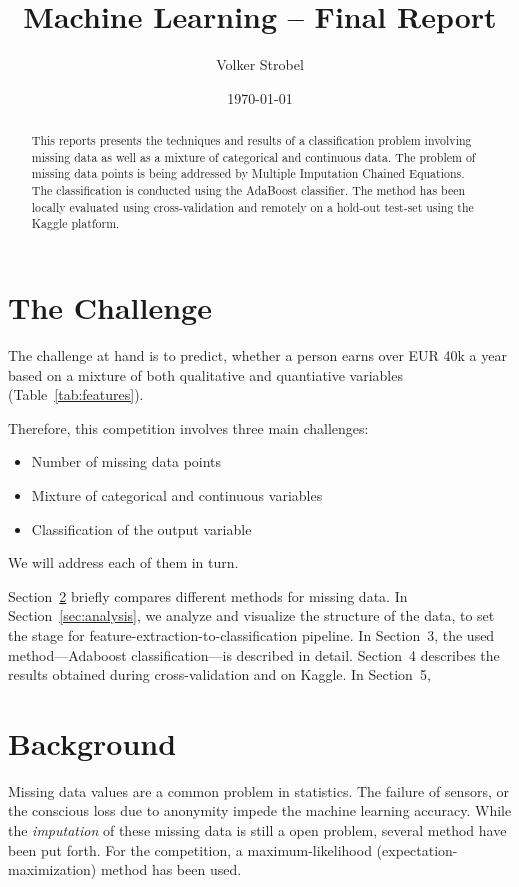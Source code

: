 \documentclass{scrartcl}
\title{Machine Learning -- Final Report}
\author{Volker Strobel}
\date{\today}
\begin{document}
\maketitle

\begin{abstract}
  This reports presents the techniques and results of a classification
  problem involving missing data as well as a mixture of categorical
  and continuous data. The problem of missing data points is being
  addressed by Multiple Imputation Chained Equations. The
  classification is conducted using the AdaBoost classifier. The
  method has been locally evaluated using cross-validation and
  remotely on a hold-out test-set using the Kaggle platform.
\end{abstract}

\section{The Challenge}
\label{sec:introduction}

The challenge at hand is to predict, whether a person earns over EUR
40k a year based on a mixture of both qualitative and quantiative
variables (Table~\ref{tab:features}).

Therefore, this competition involves three main challenges:
\begin{itemize}
\item Number of missing data points
\item Mixture of categorical and continuous variables
\item Classification of the output variable
\end{itemize}

We will address each of them in turn.

Section~\ref{sec:background} briefly compares different methods for
missing data. In Section~\ref{sec:analysis}, we analyze and visualize
the structure of the data, to set the stage for
feature-extraction-to-classification pipeline. In Section~3, the used
method---Adaboost classification---is described in detail. Section~4
describes the results obtained during cross-validation and on
Kaggle. In Section~5,

\section{Background}
\label{sec:background}

Missing data values are a common problem in statistics. The failure of
sensors, or the conscious loss due to anonymity impede the machine
learning accuracy. While the \emph{imputation} of these missing data
is still a open problem, several method have been put forth. For the
competition, a maximum-likelihood (expectation-maximization) method
has been used.
\end{document}
